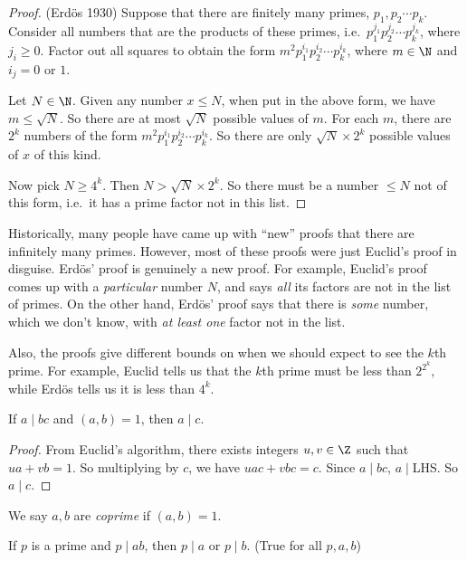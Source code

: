 \documentclass[a4paper]{article}
\begin{document}
\begin{proof}
  (Erd\"{o}s 1930) Suppose that there are finitely many primes, $p_1, p_2\cdots p_k$. Consider all numbers that are the products of these primes, i.e.\ $p_1^{j_1}p_2^{j_2}\cdots p_k^{j_k}$, where $j_i \geq 0$. Factor out all squares to obtain the form $m^2p_1^{i_1}p_2^{i_2}\cdots p_k^{i_k}$, where $m\in \N$ and $i_j = 0$ or $1$.

  Let $N\in\N$. Given any number $x \leq N$, when put in the above form, we have $m \leq \sqrt{N}$. So there are at most $\sqrt{N}$ possible values of $m$. For each $m$, there are $2^k$ numbers of the form $m^2p_1^{i_1}p_2^{i_2}\cdots p_k^{i_k}$. So there are only $\sqrt{N}\times 2^k$ possible values of $x$ of this kind.

  Now pick $N\geq 4^k$. Then $N > \sqrt{N}\times 2^k$. So there must be a number $\leq N$ not of this form, i.e.\ it has a prime factor not in this list.
\end{proof}
Historically, many people have came up with ``new'' proofs that there are infinitely many primes. However, most of these proofs were just Euclid's proof in disguise. Erd\"os' proof is genuinely a new proof. For example, Euclid's proof comes up with a \emph{particular} number $N$, and says \emph{all} its factors are not in the list of primes. On the other hand, Erd\"os' proof says that there is \emph{some} number, which we don't know, with \emph{at least one} factor not in the list.

Also, the proofs give different bounds on when we should expect to see the $k$th prime. For example, Euclid tells us that the $k$th prime must be less than $2^{2^k}$, while Erd\"os tells us it is less than $4^k$.

\begin{thm}
  If $a\mid bc$ and $(a, b) = 1$, then $a \mid c$.
\end{thm}

\begin{proof}
  From Euclid's algorithm, there exists integers $u, v\in \Z$ such that $ua + vb = 1$. So multiplying by $c$, we have $uac + vbc = c$. Since $a \mid bc$, $a \mid $LHS. So $a \mid c$.
\end{proof}

\begin{defi}
  We say $a, b$ are \emph{coprime} if $(a, b) = 1$.
\end{defi}

\begin{cor}
  If $p$ is a prime and $p\mid ab$, then $p\mid a$ or $p\mid b$. (True for all $p, a, b$)
\end{cor}
\end{document}
